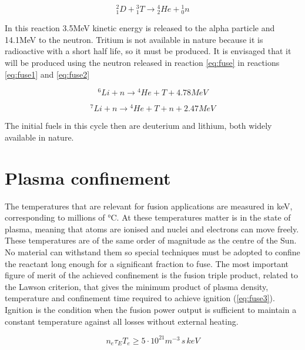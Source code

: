 \begin{equation}
{ }^2_1 D+ { }^3_1T \rightarrow { }^4_2He+{ }^1_0n
\label{eq:fuse}
\end{equation}

In this reaction 3.5MeV kinetic energy is released to the alpha particle and 14.1MeV to the neutron. Tritium is not available in nature because it is radioactive with a short half life, so it must be produced. It is envisaged that it will be produced using the neutron released in reaction \ref{eq:fuse} in reactions \ref{eq:fuse1} and \ref{eq:fuse2}

\begin{equation}
{}^{6}Li + n \rightarrow {}^{4}He +T +4.78MeV
\label{eq:fuse1}
\end{equation}

\begin{equation}
{}^{7}Li + n \rightarrow {}^{4}He +T +n +2.47MeV
\label{eq:fuse2}
\end{equation}

The initial fuels in this cycle then are deuterium and lithium, both widely available in nature.

\section{Plasma confinement}

The temperatures that are relevant for fusion applications are measured in keV, corresponding to millions of °C. At these temperatures matter is in the state of plasma, meaning that atoms are ionised and nuclei and electrons can move freely. These temperatures are of the same order of magnitude as the centre of the Sun. No material can withstand them so special techniques must be adopted to confine the reactant long enough for a significant fraction to fuse. The most important figure of merit of the achieved confinement is the fusion triple product, related to the Lawson criterion, that gives the minimum product of plasma density, temperature and confinement time required to achieve ignition (\autoref{eq:fuse3}). Ignition is the condition when the fusion power output is sufficient to maintain a constant temperature against all losses without external heating.

\begin{equation}
{n_e} {\tau }_{E} T_e  \geq  5\cdot{10}^{21}{ m }^{ -3 }\,s\,keV
\label{eq:fuse3}
\end{equation}

